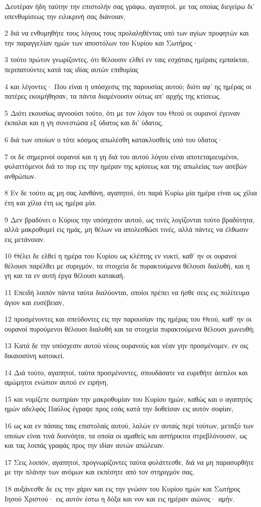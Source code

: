 \par Δευτέραν ήδη ταύτην την επιστολήν σας γράφω, αγαπητοί, με τας οποίας διεγείρω δι' υπενθυμίσεως την ειλικρινή σας διάνοιαν,
\par 2 διά να ενθυμηθήτε τους λόγους τους προλαληθέντας υπό των αγίων προφητών και την παραγγελίαν ημών των αποστόλων του Κυρίου και Σωτήρος·
\par 3 τούτο πρώτον γνωρίζοντες, ότι θέλουσιν ελθεί εν ταις εσχάταις ημέραις εμπαίκται, περιπατούντες κατά τας ιδίας αυτών επιθυμίας
\par 4 και λέγοντες· Που είναι η υπόσχεσις της παρουσίας αυτού; διότι αφ' ης ημέρας οι πατέρες εκοιμήθησαν, τα πάντα διαμένουσιν ούτως απ' αρχής της κτίσεως.
\par 5 Διότι εκουσίως αγνοούσι τούτο, ότι με τον λόγον του Θεού οι ουρανοί έγειναν έκπαλαι και η γη συνεστώσα εξ ύδατος και δι' ύδατος,
\par 6 διά των οποίων ο τότε κόσμος απωλέσθη κατακλυσθείς υπό του ύδατος·
\par 7 οι δε σημερινοί ουρανοί και η γη διά του αυτού λόγου είναι αποτεταμιευμένοι, φυλαττόμενοι διά το πυρ εις την ημέραν της κρίσεως και της απωλείας των ασεβών ανθρώπων.
\par 8 Εν δε τούτο ας μη σας λανθάνη, αγαπητοί, ότι παρά Κυρίω μία ημέρα είναι ως χίλια έτη και χίλια έτη ως ημέρα μία.
\par 9 Δεν βραδύνει ο Κύριος την υπόσχεσιν αυτού, ως τινές λογίζονται τούτο βραδύτητα, αλλά μακροθυμεί εις ημάς, μη θέλων να απολεσθώσι τινές, αλλά πάντες να έλθωσιν εις μετάνοιαν.
\par 10 Θέλει δε ελθεί η ημέρα του Κυρίου ως κλέπτης εν νυκτί, καθ' ην οι ουρανοί θέλουσι παρέλθει με συριγμόν, τα στοιχεία δε πυρακτούμενα θέλουσι διαλυθή, και η γη και τα εν αυτή έργα θέλουσι κατακαή.
\par 11 Επειδή λοιπόν πάντα ταύτα διαλύονται, οποίοι πρέπει να ήσθε σεις εις πολίτευμα άγιον και ευσέβειαν,
\par 12 προσμένοντες και σπεύδοντες εις την παρουσίαν της ημέρας του Θεού, καθ' ην οι ουρανοί πυρούμενοι θέλουσι διαλυθή και τα στοιχεία πυρακτούμενα θέλουσι χωνευθή;
\par 13 Κατά δε την υπόσχεσιν αυτού νέους ουρανούς και νέαν γην προσμένομεν, εν οις δικαιοσύνη κατοικεί.
\par 14 Διά τούτο, αγαπητοί, ταύτα προσμένοντες, σπουδάσατε να ευρεθήτε άσπιλοι και αμώμητοι ενώπιον αυτού εν ειρήνη,
\par 15 και νομίζετε σωτηρίαν την μακροθυμίαν του Κυρίου ημών, καθώς και ο αγαπητός ημών αδελφός Παύλος έγραψε προς εσάς κατά την δοθείσαν εις αυτόν σοφίαν,
\par 16 ως και εν πάσαις ταις επιστολαίς αυτού, λαλών εν αυταίς περί τούτων, μεταξύ των οποίων είναι τινά δυσνόητα, τα οποία οι αμαθείς και αστήρικτοι στρεβλόνουσιν, ως και τας λοιπάς γραφάς προς την ιδίαν αυτών απώλειαν.
\par 17 Σεις λοιπόν, αγαπητοί, προγνωρίζοντες ταύτα φυλάττεσθε, διά να μη παρασυρθήτε με την πλάνην των ανόμων και εκπέσητε από τον στηριγμόν σας,
\par 18 αυξάνεσθε δε εις την χάριν και εις την γνώσιν του Κυρίου ημών και Σωτήρος Ιησού Χριστού· εις αυτόν έστω η δόξα και νυν και εις ημέραν αιώνος· αμήν.


